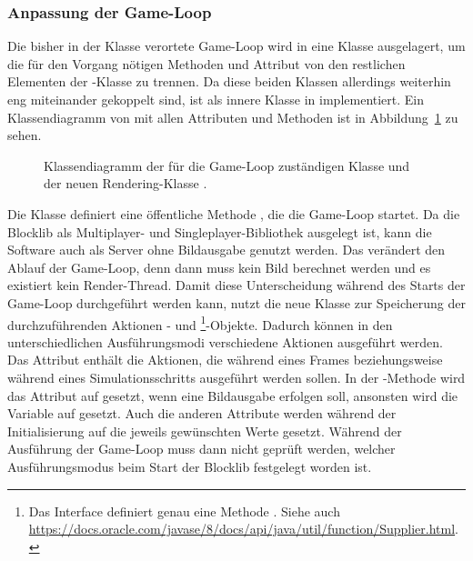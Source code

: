 \subsubsection{Anpassung der Game-Loop}\label{sec:adjustGameLoop}
Die bisher in der Klasse  verortete Game-Loop wird in eine Klasse  ausgelagert, um die für den Vorgang nötigen Methoden und Attribut von den restlichen Elementen der -Klasse zu trennen. Da diese beiden Klassen allerdings weiterhin eng miteinander gekoppelt sind, ist  als innere Klasse in  implementiert. Ein Klassendiagramm von   mit allen Attributen und Methoden ist in Abbildung~\ref{fig:DiagGameLoop} zu sehen.
\begin{figure}[htbp]
	\centering
	
	\caption[Klassendiagramm von  und .]{Klassendiagramm der für die Game-Loop zuständigen Klasse  und der neuen Rendering-Klasse .}\label{fig:DiagGameLoop}
\end{figure}
Die Klasse definiert eine öffentliche Methode , die die Game-Loop startet. Da die Blocklib als Multiplayer- und Singleplayer-Bibliothek ausgelegt ist, kann die Software auch als Server ohne Bildausgabe genutzt werden. Das verändert den Ablauf der Game-Loop, denn dann muss kein Bild berechnet werden und es existiert kein Render-Thread. Damit diese Unterscheidung während des Starts der Game-Loop durchgeführt werden kann, nutzt die neue Klasse  zur Speicherung der durchzuführenden Aktionen - und \footnote{Das Interface  definiert genau eine Methode . Siehe auch \url{https://docs.oracle.com/javase/8/docs/api/java/util/function/Supplier.html}.}-Objekte. Dadurch können in den unterschiedlichen Ausführungsmodi verschiedene Aktionen ausgeführt werden. Das Attribut  enthält die Aktionen, die während eines Frames beziehungsweise während eines Simulationsschritts ausgeführt werden sollen. In der -Methode wird das Attribut auf  gesetzt, wenn eine Bildausgabe erfolgen soll, ansonsten wird die Variable auf  gesetzt. Auch die anderen Attribute werden während der Initialisierung auf die jeweils gewünschten Werte gesetzt. Während der Ausführung der Game-Loop muss dann nicht geprüft werden, welcher Ausführungsmodus beim Start der Blocklib festgelegt worden ist.

